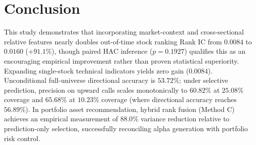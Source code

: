 \documentclass[11pt,a4paper]{article}
\begin{document}
\section{Conclusion}
This study demonstrates that incorporating market-context and cross-sectional relative features nearly doubles out-of-time stock ranking Rank IC from $0.0084$ to $0.0160$ ($+91.1\%$), though paired HAC inference ($p=0.1927$) qualifies this as an encouraging empirical improvement rather than proven statistical superiority. Expanding single-stock technical indicators yields zero gain ($0.0084$). Unconditional full-universe directional accuracy is $53.72\%$; under selective prediction, precision on upward calls scales monotonically to $60.82\%$ at $25.08\%$ coverage and $65.68\%$ at $10.23\%$ coverage (where directional accuracy reaches $56.89\%$). In portfolio asset recommendation, hybrid rank fusion (Method C) achieves an empirical measurement of $88.0\%$ variance reduction relative to prediction-only selection, successfully reconciling alpha generation with portfolio risk control.



\end{document}
